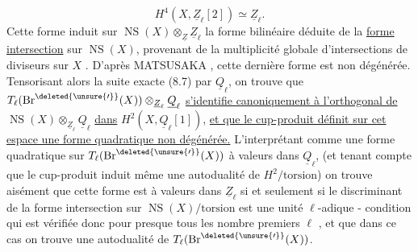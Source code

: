 \[
H^4(X,\underline Z_{\ell}[2])\simeq\underline Z_{\ell}.
\]
 Cette forme induit sur $\operatorname{NS}(X)\otimes_{\underline Z}\underline Z_{\ell}$ la forme bilinéaire déduite de la \uline{forme intersection} sur $\operatorname{NS}(X)$, provenant de la multiplicité
globale d'intersections de diviseurs sur $X$ \inserted{[15]} . D'après
MATSUSAKA \inserted{[27]}, cette dernière forme est non dégénérée. Tensorisant alors la suite exacte (8.7) par $\underline Q_{\ell}$, on trouve que $T_{\ell}(\operatorname{Br}^{\deleted{\unsure{\prime}}}(X))\otimes_{\underline Z_{\ell}}\underline Q_{\ell}$ \uline{s'identifie canoniquement à l'orthogonal de} $\operatorname{NS}(X)\otimes_{\underline Z_{\ell}}\underline Q_{\ell}$ \uline{dans} $H^2(X,\underline Q_{\ell}[1])$, \uline{et que le cup-produit définit sur cet espace une forme quadratique non dégénérée.}
L'interprétant comme une forme quadratique sur $T_{\ell}(\operatorname{Br}^{\deleted{\unsure{\prime}}}(X))$ à valeurs dans $\underline Q_{\ell}$, (et tenant compte que le cup-produit induit même une autodualité de $H^2/\mathrm{torsion}$) on trouve aisément que cette forme est à valeurs dans $\underline Z_{\ell}$ si et seulement si le discriminant de la forme intersection sur $\operatorname{NS}(X)/\mathrm{torsion}$ est une unité $\ell$-adique - condition qui est vérifiée donc pour presque tous les nombre premiers $\ell$ \deleted{\unsure{-}}, et que dans ce cas on trouve une autodualité de $T_{\ell}(\operatorname{Br}^{\deleted{\unsure{\prime}}}(X))$.


